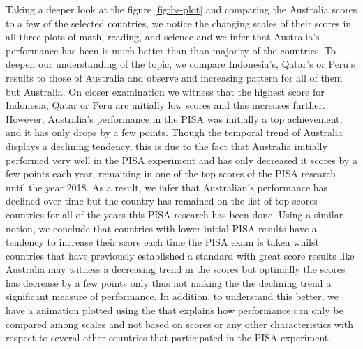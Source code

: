 Taking a deeper look at the figure \ref{fig:bs-plot} and comparing the
Australia scores to a few of the selected countries, we notice the
changing scales of their scores in all three plots of math, reading, and
science and we infer that Australia's performance has been is much
better than than majority of the countries. To deepen our understanding
of the topic, we compare Indonesia's, Qatar's or Peru's results to those
of Australia and observe and increasing pattern for all of them but
Australia. On closer examination we witness that the highest score for
Indonesia, Qatar or Peru are initially low scores and this increases
further. However, Australia's performance in the PISA was initially a
top achievement, and it has only drops by a few points. Though the
temporal trend of Australia displays a declining tendency, this is due
to the fact that Australia initially performed very well in the PISA
experiment and has only decreased it scores by a few points each year,
remaining in one of the top scores of the PISA research until the year
2018. As a result, we infer that Australian's performance has declined
over time but the country has remained on the list of top scores
countries for all of the years this PISA research has been done. Using a
similar notion, we conclude that countries with lower initial PISA
results have a tendency to increase their score each time the PISA exam
is taken whilst countries that have previously established a standard
with great score results like Australia may witness a decreasing trend
in the scores but optimally the scores has decrease by a few points only
thus not making the the declining trend a significant measure of
performance. In addition, to understand this better, we have a animation
plotted using  \citep{gganimate} the that explains
how performance can only be compared among scales and not based on
scores or any other characteristics with respect to several other
countries that participated in the PISA experiment.

